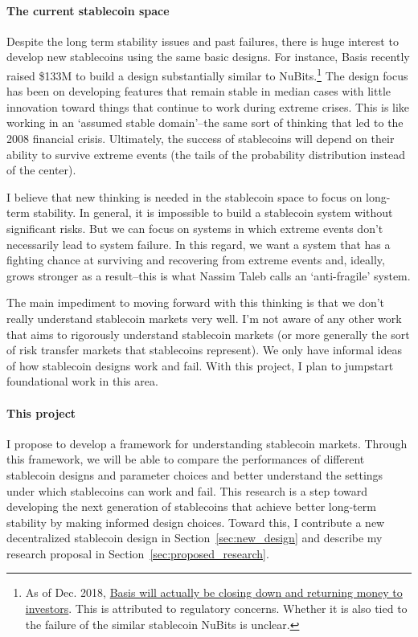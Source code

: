 \documentclass[10pt]{article}
\begin{document}
\paragraph{The current stablecoin space}
Despite the long term stability issues and past failures, there is huge interest to develop new stablecoins using the same basic designs. For instance, Basis recently raised \$133M to build a design substantially similar to NuBits.\footnote{As of Dec. 2018, \href{https://cointelegraph.com/news/major-stablecoin-basis-to-close-return-funds-to-investors-sources}{Basis will actually be closing down and returning money to investors}. This is attributed to regulatory concerns. Whether it is also tied to the failure of the similar stablecoin NuBits is unclear.} The design focus has been on developing features that remain stable in median cases with little innovation toward things that continue to work during extreme crises. This is like working in an `assumed stable domain'--the same sort of thinking that led to the 2008 financial crisis. Ultimately, the success of stablecoins will depend on their ability to survive extreme events (the tails of the probability distribution instead of the center).

I believe that new thinking is needed in the stablecoin space to focus on long-term stability. In general, it is impossible to build a stablecoin system without significant risks. But we can focus on systems in which extreme events don't necessarily lead to system failure. In this regard, we want a system that has a fighting chance at surviving and recovering from extreme events and, ideally, grows stronger as a result--this is what Nassim Taleb calls an `anti-fragile' system.

The main impediment to moving forward with this thinking is that we don't really understand stablecoin markets very well. I'm not aware of any other work that aims to rigorously understand stablecoin markets (or more generally the sort of risk transfer markets that stablecoins represent). We only have informal ideas of how stablecoin designs work and fail. With this project, I plan to jumpstart foundational work in this area.


\paragraph{This project}
I propose to develop a framework for understanding stablecoin markets. Through this framework, we will be able to compare the performances of different stablecoin designs and parameter choices and better understand the settings under which stablecoins can work and fail. This research is a step toward developing the next generation of stablecoins that achieve better long-term stability by making informed design choices. Toward this, I contribute a new decentralized stablecoin design in Section~\ref{sec:new_design} and describe my research proposal in Section~\ref{sec:proposed_research}.
\end{document}
